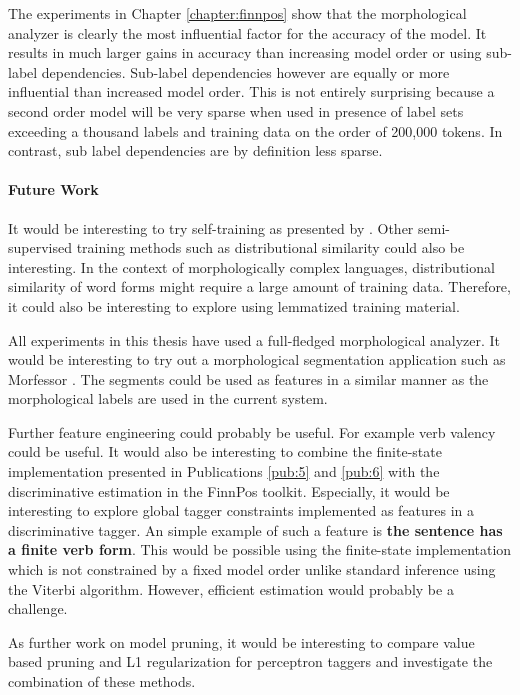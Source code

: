 The experiments in Chapter \ref{chapter:finnpos} show that the
morphological analyzer is clearly the most influential factor for the
accuracy of the model. It results in much larger gains in accuracy
than increasing model order or using sub-label dependencies. Sub-label
dependencies however are equally or more influential than increased
model order. This is not entirely surprising because a second order
model will be very sparse when used in presence of label sets
exceeding a thousand labels and training data on the order of 200,000
tokens. In contrast, sub label dependencies are by definition less
sparse.

\paragraph{Future Work} It would be interesting to try self-training
as presented by \cite{Sogaard2011}. Other semi-supervised training
methods such as distributional similarity could also be
interesting. In the context of morphologically complex languages,
distributional similarity of word forms might require a large amount
of training data. Therefore, it could also be interesting to explore
using lemmatized training material.

All experiments in this thesis have used a full-fledged morphological
analyzer. It would be interesting to try out a morphological
segmentation application such as Morfessor \citep{Creutz2002}. The
segments could be used as features in a similar manner as the
morphological labels are used in the current system.

Further feature engineering could probably be useful. For example verb
valency could be useful. It would also be interesting to combine the
finite-state implementation presented in Publications \ref{pub:5} and
\ref{pub:6} with the discriminative estimation in the FinnPos
toolkit. Especially, it would be interesting to explore global tagger
constraints implemented as features in a discriminative tagger. An
simple example of such a feature is {\bf the sentence has a finite
  verb form}. This would be possible using the finite-state
implementation which is not constrained by a fixed model order unlike
standard inference using the Viterbi algorithm. However, efficient
estimation would probably be a challenge.

As further work on model pruning, it would be interesting to compare
value based pruning and L1 regularization for perceptron taggers and
investigate the combination of these methods.


